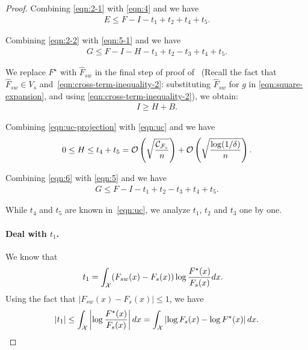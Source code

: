 \begin{proof}
Combining \eqref{eqn:2-1} with \eqref{eqn:4} and we have
\begin{align}
    E \le F - I - t_1 + t_2 + t_4 + t_5. \label{eqn:5-1}
\end{align}

Combining \eqref{eqn:2-2} with \eqref{eqn:5-1} and we have
\begin{align}
    G \le F - I - H - t_1 + t_2 - t_3 + t_4 + t_5. \label{eqn:5}
\end{align}

We replace $F^\star$ with $\hat{F}_{sw}$ in the final step of proof of~ (Recall the fact that $\hat{F}_{sw} \in V_s$ and~\eqref{eqn:cross-term-inequality-2}: substituting $\hat{F}_{sw}$ for $g$ in \eqref{eqn:square-expansion}, and using \eqref{eqn:cross-term-inequality-2}), we obtain:
\begin{align}
    I \ge H + B. \label{eqn:uc-projection}
\end{align}

Combining \eqref{eqn:uc-projection} with \eqref{eqn:uc} and we have
\begin{align}
    0 \le H \le t_4 + t_5 = \mathcal{O}\left(\sqrt{\frac{\mathcal{C}_{\mathcal{F}_s}}{n}}\right) + \mathcal{O}\left(\sqrt{\frac{\log(1/\delta)}{n}}\right). \label{eqn:6}
\end{align}

Combining \eqref{eqn:6} with \eqref{eqn:5} and we have
\begin{align}
    G \le F - I - t_1 + t_2 - t_3 + t_4 + t_5. \label{eqn:7}
\end{align}

While $t_4$ and $t_5$ are known in~\eqref{eqn:uc}, we analyze $t_1$, $t_2$ and $t_3$ one by one.







\paragraph{Deal with $t_1$.}
We know that
\begin{align}
    t_1 & = \int_{\mathcal{X}} (F_{sw}(x)-F_s(x))\log \frac{F^\star(x)}{F_s(x)} d x. \nonumber
\end{align}
Using the fact that $\left|F_{sw}(x)-F_s(x)\right| \le 1$, we have
\begin{align} \label{def_t_1_ineq}
    |t_1| \le \int_{\mathcal{X}} \left| \log \frac{F^\star(x)}{F_s(x)} \right| d x = \int_{\mathcal{X}} \left| \log F_s(x) - \log F^\star(x) \right| d x.
\end{align}


\end{proof}
